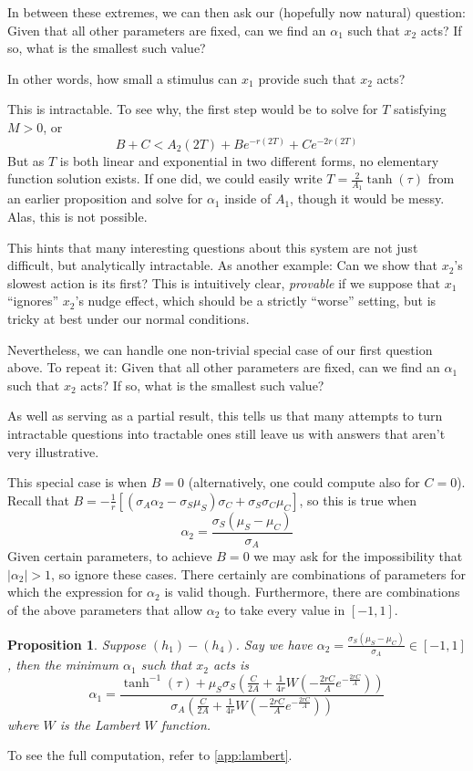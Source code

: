\documentclass[preprint,12pt]{elsarticle}
\newcommand{\lt}{\left}
\newcommand{\rt}{\right}
\newtheorem{prop}{Proposition}
\begin{document}
In between these extremes, we can then ask our (hopefully now natural) question: Given that all other parameters are fixed, can we find an $\alpha_1$ such that $x_2$ acts? If so, what is the smallest such value? 

In other words, how small a stimulus can $x_1$ provide such that $x_2$ acts? 

This is intractable. To see why, the first step would be to solve for $T$ satisfying $M > 0$, or \[
B +C  < A_2(2T) + Be^{-r(2T)} + Ce^{-2r(2T)}
\]
But as $T$ is both linear and exponential in two different forms, no elementary function solution exists. If one did, we could easily write $T = \frac{2}{A_1}\tanh(\tau)$ from an earlier proposition and solve for $\alpha_1$ inside of $A_1$, though it would be messy. Alas, this is not possible. 

This hints that many interesting questions about this system are not just difficult, but analytically intractable. As another example: Can we show that $x_2$'s slowest action is its first? This is intuitively clear, \textit{provable} if we suppose that $x_1$ ``ignores'' $x_2$'s nudge effect, which should be a strictly ``worse'' setting, but is tricky at best under our normal conditions. 

Nevertheless, we can handle one non-trivial special case of our first question above. To repeat it: Given that all other parameters are fixed, can we find an $\alpha_1$ such that $x_2$ acts? If so, what is the smallest such value? 

As well as serving as a partial result, this tells us that many attempts to turn intractable questions into tractable ones still leave us with answers that aren't very illustrative.

This special case is when $B = 0$ (alternatively, one could compute also for $C=0$). Recall that $B=-\frac{1}{r}[(\sigma_A\alpha_2-\sigma_S\mu_S)\sigma_C+\sigma_S\sigma_C\mu_C]$, so this is true when \[
\alpha_2 = \frac{\sigma_S(\mu_S - \mu_C)}{\sigma_A}\]
Given certain parameters, to achieve $B = 0$ we may ask for the impossibility that $|\alpha_2| > 1$, so ignore these cases. There certainly are combinations of parameters for which the expression for $\alpha_2$ is valid though. Furthermore, there are combinations of the above parameters that allow $\alpha_2$ to take every value in $[-1,1]$.
\begin{prop}
    Suppose $(h_1)-(h_4)$. Say we have $\alpha_2 = \frac{\sigma_S(\mu_S - \mu_C)}{\sigma_A} \in [-1,1]$, then the minimum $\alpha_1$ such that $x_2$ acts is \[
\alpha_1 
= 
\frac
{
  \tanh^{-1}(\tau)
  +
  \mu_S\sigma_S
  \lt(\frac{C}{2A} + \frac{1}{4r}W\!\lt(-\frac{2rC}{A}e^{-\frac{2rC}{A}}\rt)\rt)
}
{
  \sigma_A
  \lt(\frac{C}{2A} + \frac{1}{4r}W\!\lt(-\frac{2rC}{A}e^{-\frac{2rC}{A}}\rt)\rt)
}
\]
where $W$ is the Lambert $W$ function.
\end{prop}
To see the full computation, refer to \ref{app:lambert}.
\end{document}
